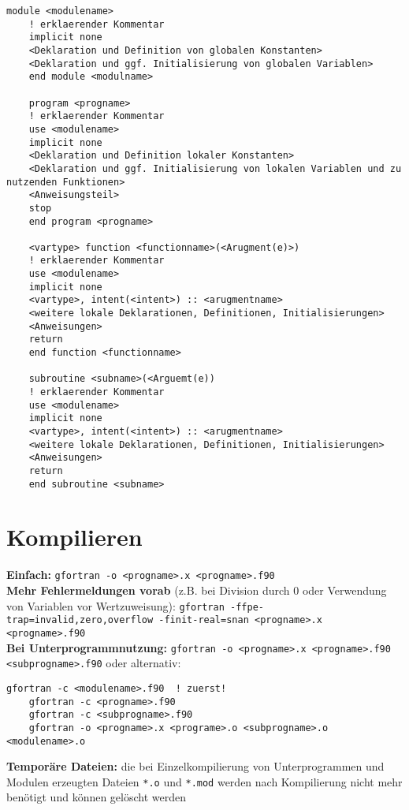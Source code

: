 \documentclass[a4paper, twocolumn]{scrarticle}
\begin{document}
  \begin{lstlisting}[caption={\textbf{Aufbau Unterprogramme und Module (analog zu Hauptprogramm)}}]
    module <modulename>
    ! erklaerender Kommentar
    implicit none
    <Deklaration und Definition von globalen Konstanten>
    <Deklaration und ggf. Initialisierung von globalen Variablen>
    end module <modulname>
    
    program <progname>
    ! erklaerender Kommentar
    use <modulename>
    implicit none
    <Deklaration und Definition lokaler Konstanten>
    <Deklaration und ggf. Initialisierung von lokalen Variablen und zu nutzenden Funktionen>
    <Anweisungsteil>
    stop
    end program <progname>
    
    <vartype> function <functionname>(<Arugment(e)>)
    ! erklaerender Kommentar
    use <modulename>
    implicit none
    <vartype>, intent(<intent>) :: <arugmentname>
    <weitere lokale Deklarationen, Definitionen, Initialisierungen>
    <Anweisungen>
    return
    end function <functionname>
    
    subroutine <subname>(<Arguemt(e))
    ! erklaerender Kommentar
    use <modulename>
    implicit none
    <vartype>, intent(<intent>) :: <arugmentname>
    <weitere lokale Deklarationen, Definitionen, Initialisierungen>
    <Anweisungen>
    return
    end subroutine <subname>
  \end{lstlisting}
  \section{Kompilieren}
  \textbf{Einfach:} \lstinline[style=neutral]|gfortran -o <progname>.x <progname>.f90| \\
  \textbf{Mehr Fehlermeldungen vorab} (z.B. bei Division durch 0 oder Verwendung von Variablen vor Wertzuweisung): \lstinline[style=neutral]|gfortran -ffpe-trap=invalid,zero,overflow -finit-real=snan <progname>.x <progname>.f90|\\
  \textbf{Bei Unterprogrammnutzung:} \lstinline[style=neutral]|gfortran -o <progname>.x <progname>.f90 <subprogname>.f90| oder alternativ:
  \begin{lstlisting}[style=neutral,caption={\textbf{Kompilieren von Haupt- und Unterprogrammenn}}]
    gfortran -c <modulename>.f90  ! zuerst!
    gfortran -c <progname>.f90 
    gfortran -c <subprogname>.f90 
    gfortran -o <progname>.x <programe>.o <subprogname>.o <modulename>.o
  \end{lstlisting}
  \textbf{Temporäre Dateien:} die bei Einzelkompilierung von Unterprogrammen und Modulen erzeugten Dateien \lstinline|*.o| und \lstinline|*.mod| werden nach Kompilierung nicht mehr benötigt und können gelöscht werden
\end{document}
